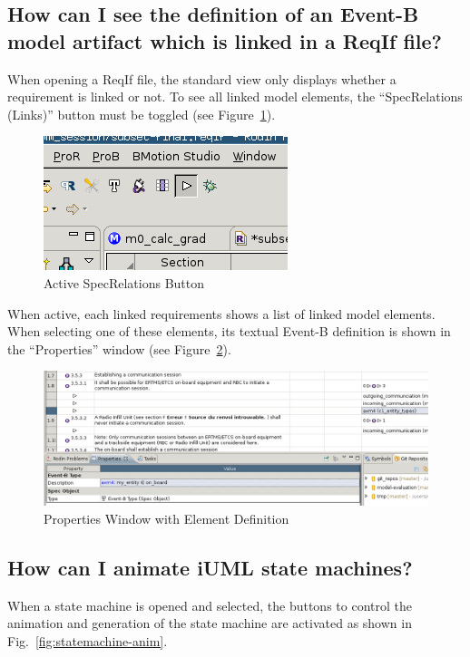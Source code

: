 \documentclass{template/openetcs_article}
\begin{document}
\subsection{How can I see the definition of an Event-B model artifact which is
  linked in a ReqIf file?}
\label{sec:how-can-i}


When opening a ReqIf file, the standard view only displays whether a
requirement is linked or not. To see all linked model elements, the
``SpecRelations (Links)'' button must be toggled (see
Figure~\ref{fig:spec-relations-button}).

\begin{figure}[H]
  \centering
  \includegraphics[width=.35\textwidth]{ProR-Link-Toggle}
  \caption{Active SpecRelations Button}
  \label{fig:spec-relations-button}
\end{figure}

When active, each linked requirements shows a list of linked model
elements. When selecting one of these elements, its textual Event-B definition
is shown in the ``Properties'' window (see
Figure~\ref{fig:properties-window-element}).

\begin{figure}[H]
  \centering
  \includegraphics[width=\textwidth]{ProR-Link-View}
  \caption{Properties Window with Element Definition}
  \label{fig:properties-window-element}
\end{figure}


\subsection{How can I animate iUML state machines?}
\label{sec:how-can-i-1}

When a state machine is opened and selected, the buttons to control the
animation and generation of the state machine are activated as shown in
Fig.~\ref{fig:statemachine-anim}. 
\end{document}

